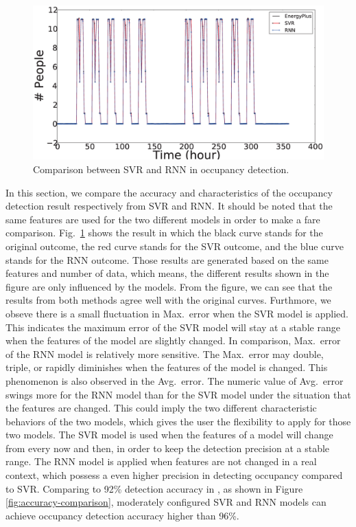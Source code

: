 \begin{figure}[!h]
\centering
\includegraphics[width=5in]{./Pics/comparison.eps}
\caption{Comparison between SVR and RNN in occupancy detection.}
\label{fig:comparison}
\end{figure}

In this section, we compare the accuracy and characteristics of the
occupancy detection result respectively from SVR and RNN. It should be noted that the same
features are used for the two different models in order to make a fare comparison.
Fig.~\ref{fig:comparison} shows the result in which the black curve
stands for the original outcome, the red curve stands for the SVR
outcome, and the blue curve stands for the RNN outcome.  Those results
are generated based on the same features and number of data, which
means, the different results shown in the figure are only influenced
by the models. From the figure, we can see that the results from both
methods agree well with the original curves.  Furthmore, we obseve
there is a small fluctuation in Max.~error when the SVR model is
applied. This indicates the maximum error of the SVR model will stay
at a stable range when the features of the model are slightly
changed. In comparison, Max.~error of the RNN model is relatively more
sensitive. The Max.~error may double, triple, or rapidly diminishes
when the features of the model is changed. This phenomenon is also
observed in the Avg.~error. The numeric value of Avg.~error swings
more for the RNN model than for the SVR model under the situation that
the features are changed. This could imply the two different
characteristic behaviors of the two models, which gives the user the
flexibility to apply for those two models. The SVR model is used when
the features of a model will change from every now and then, in order
to keep the detection precision at a stable range. The RNN model is applied
when features are not changed in a real context, which possess a even higher
precision in detecting occupancy compared to SVR.
Comparing to 92\% detection accuracy in \cite
{dong2014real}, as shown in Figure \ref{fig:accuracy-comparison}, moderately
configured SVR and RNN models can achieve occupancy detection accuracy higher
than 96\%.

